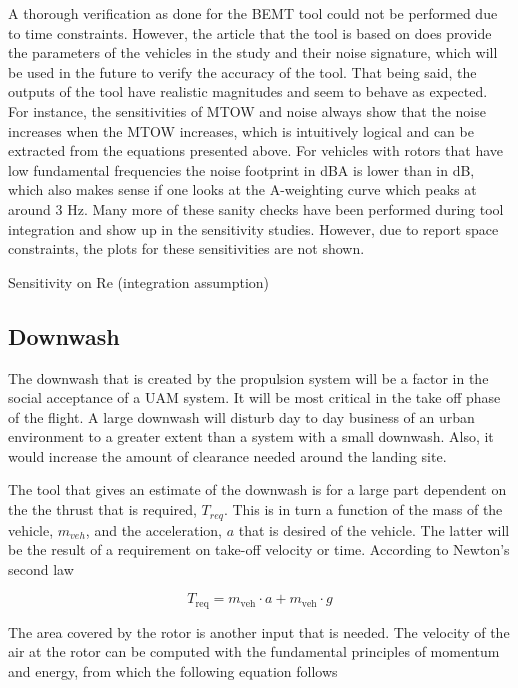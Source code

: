 A thorough verification as done for the BEMT tool could not be performed due to time constraints. However, the article that the tool is based on does provide the parameters of the vehicles in the study and their noise signature, which will be used in the future to verify the accuracy of the tool. That being said, the outputs of the tool have realistic magnitudes and seem to behave as expected. For instance, the sensitivities of MTOW and noise always show that the noise increases when the MTOW increases, which is intuitively logical and can be extracted from the equations presented above. For vehicles with rotors that have low fundamental frequencies the noise footprint in dBA is lower than in dB, which also makes sense if one looks at the A-weighting curve which peaks at around 3 Hz. Many more of these sanity checks have been performed during tool integration and show up in the sensitivity studies. However, due to report space constraints, the plots for these sensitivities are not shown.


Sensitivity on Re (integration assumption)











\subsection{Downwash}
The downwash that is created by the propulsion system will be a factor in the social acceptance of a UAM system. It will be most critical in the take off phase of the flight. A large downwash will disturb day to day business of an urban environment to a greater extent than a system with a small downwash. Also, it would increase the amount of clearance needed around the landing site. 

The tool that gives an estimate of the downwash is for a large part dependent on the the thrust that is required, $T_{req}$. This is in turn a function of the mass of the vehicle, $m_{veh}$, and the acceleration, $a$ that is desired of the vehicle. The latter will be the result of a requirement on take-off velocity or time. According to Newton's second law 

\begin{equation}
\label{downwasheq}
    T_\text{req} = m_\text{veh} \cdot a + m_\text{veh} \cdot g 
\end{equation}

The area covered by the rotor is another input that is needed. The velocity of the air at the rotor can be computed with the fundamental principles of momentum and energy, from which the following equation follows 

